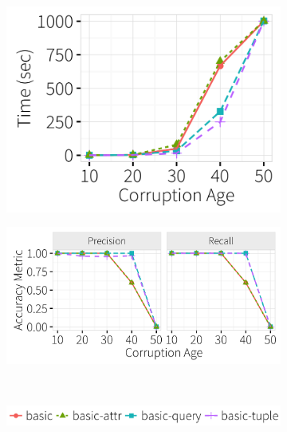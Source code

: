 \begin{figure}[t]
  \centering
    \begin{minipage}{.49\textwidth}
  \begin{subfigure}[t]{.39\textwidth}
      \includegraphics[width = .99\columnwidth]{figures/multi_time} 
      \vspace*{-.1in}
    \end{subfigure}
    \begin{subfigure}[t]{.59\textwidth}
      \includegraphics[width = .99\columnwidth]{figures/multi_pr}
      \vspace*{-.1in}
    \end{subfigure} \\
           \begin{subfigure}[t]{.99\textwidth}
           \centering
      \includegraphics[width = .59\columnwidth]{figures/multi_legend} 

\end{subfigure}
\end{minipage}
\end{figure}
